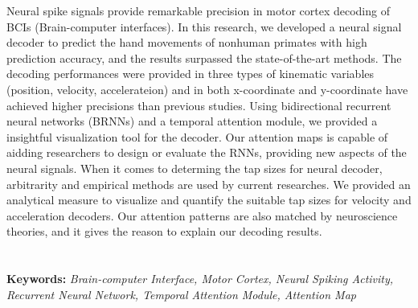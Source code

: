 Neural spike signals provide remarkable precision in motor cortex decoding of BCIs (Brain-computer interfaces).
In this research,
we developed a neural signal decoder to predict the hand movements of nonhuman primates with high prediction accuracy,
and the results surpassed the state-of-the-art methods.
The decoding performances were provided in three types of kinematic variables (position, velocity, accelerateion) and in both x-coordinate and y-coordinate have achieved higher precisions than previous studies.
Using bidirectional recurrent neural networks (BRNNs) and a temporal attention module,
we provided a insightful visualization tool for the decoder.
Our attention maps is capable of aidding researchers to design or evaluate the RNNs,
providing new aspects of the neural signals.
When it comes to determing the tap sizes for neural decoder,
arbitrarity and empirical methods are used by current researches.
We provided an analytical measure to visualize and quantify the suitable tap sizes for velocity and acceleration decoders.
Our attention patterns are also matched by neuroscience theories,
and it gives the reason to explain our decoding results.
\\
\\
\\
\textbf{Keywords:}
\textit{Brain-computer Interface, Motor Cortex, Neural Spiking Activity, Recurrent Neural Network, Temporal Attention Module, Attention Map}
